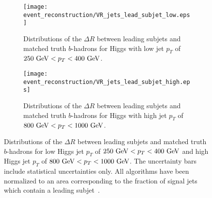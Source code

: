 \begin{figure}[htbp]
 \centering
 \begin{subfigure}[t]{0.48\textwidth}
  \centering
  \texttt{[image: event\_reconstruction/VR\_jets\_lead\_subjet\_low.eps]}
  \caption[Distributions of the $\Delta R$ between leading subjets and matched truth $b$-hadrons for Higgs with low jet $p_{T}$ of ${250~\GeV < p_{T} < 400~\GeV}$.]{%
   Distributions of the $\Delta R$ between leading subjets and matched truth $b$-hadrons for Higgs with low jet $p_{T}$ of ${250~\GeV < p_{T} < 400~\GeV}$.}
  \label{fig:VR_jets_lead_subjet_low}
 \end{subfigure}%
 \quad
 \begin{subfigure}[t]{0.48\textwidth}
  \centering
  \texttt{[image: event\_reconstruction/VR\_jets\_lead\_subjet\_high.eps]}
  \caption[Distributions of the $\Delta R$ between leading subjets and matched truth $b$-hadrons for Higgs with high jet $p_{T}$ of ${800~\GeV < p_{T} < 1000~\GeV}$.]{%
   Distributions of the $\Delta R$ between leading subjets and matched truth $b$-hadrons for Higgs with high jet $p_{T}$ of ${800~\GeV < p_{T} < 1000~\GeV}$.}
  \label{fig:VR_jets_lead_subjet_high}
 \end{subfigure}%
 \caption[Distributions of the $\Delta R$ between leading subjets and matched truth $b$-hadrons for two different Higgs jet $p_{T}$ bins.]{%
  Distributions of the $\Delta R$ between leading subjets and matched truth $b$-hadrons for low Higgs jet $p_{T}$ of ${250~\GeV < p_{T} < 400~\GeV}$ and high Higgs jet $p_{T}$ of ${800~\GeV < p_{T} < 1000~\GeV}$.
  The uncertainty bars include statistical uncertainties only.
  All algorithms have been normalized to an area corresponding to the fraction of signal jets which contain a leading subjet~\cite{ATL-PHYS-PUB-2017-010}.}
 \label{fig:VR_jets_lead_subjet}
\end{figure}

